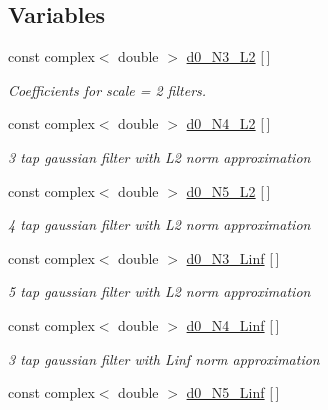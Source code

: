\subsection*{Variables}
\begin{DoxyCompactItemize}
\item 
const complex$<$ double $>$ \hyperlink{IIRGausDeriv_8h_af5e16ead99087cccae6b8aa7a89a0952}{d0\+\_\+\+N3\+\_\+\+L2} \mbox{[}$\,$\mbox{]}\label{IIRGausDeriv_8h_af5e16ead99087cccae6b8aa7a89a0952}

\begin{DoxyCompactList}\small\item\em Coefficients for scale = 2 filters. \end{DoxyCompactList}\item 
const complex$<$ double $>$ \hyperlink{IIRGausDeriv_8h_a2a1aeabf73a18a2c89f07ff0f43295c8}{d0\+\_\+\+N4\+\_\+\+L2} \mbox{[}$\,$\mbox{]}\label{IIRGausDeriv_8h_a2a1aeabf73a18a2c89f07ff0f43295c8}

\begin{DoxyCompactList}\small\item\em 3 tap gaussian filter with L2 norm approximation \end{DoxyCompactList}\item 
const complex$<$ double $>$ \hyperlink{IIRGausDeriv_8h_a77152b0c665b268cefdf513125e929e3}{d0\+\_\+\+N5\+\_\+\+L2} \mbox{[}$\,$\mbox{]}\label{IIRGausDeriv_8h_a77152b0c665b268cefdf513125e929e3}

\begin{DoxyCompactList}\small\item\em 4 tap gaussian filter with L2 norm approximation \end{DoxyCompactList}\item 
const complex$<$ double $>$ \hyperlink{IIRGausDeriv_8h_a8c8a923a255f7d1433ccbb5ca69e6848}{d0\+\_\+\+N3\+\_\+\+Linf} \mbox{[}$\,$\mbox{]}\label{IIRGausDeriv_8h_a8c8a923a255f7d1433ccbb5ca69e6848}

\begin{DoxyCompactList}\small\item\em 5 tap gaussian filter with L2 norm approximation \end{DoxyCompactList}\item 
const complex$<$ double $>$ \hyperlink{IIRGausDeriv_8h_a5d56d85deaa8b0093b9a25f6dd2e390c}{d0\+\_\+\+N4\+\_\+\+Linf} \mbox{[}$\,$\mbox{]}\label{IIRGausDeriv_8h_a5d56d85deaa8b0093b9a25f6dd2e390c}

\begin{DoxyCompactList}\small\item\em 3 tap gaussian filter with Linf norm approximation \end{DoxyCompactList}\item 
const complex$<$ double $>$ \hyperlink{IIRGausDeriv_8h_a430436bf7328ee9f31e8629e69939c45}{d0\+\_\+\+N5\+\_\+\+Linf} \mbox{[}$\,$\mbox{]}\label{IIRGausDeriv_8h_a430436bf7328ee9f31e8629e69939c45}


\end{DoxyCompactItemize}
